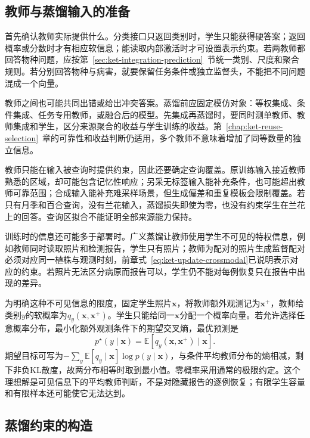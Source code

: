 \subsection{教师与蒸馏输入的准备}
\label{sec:ket-integration-teachers-inputs}

首先确认教师实际提供什么。分类接口只返回类别时，学生只能获得硬答案；返回概率或分数时才有相应软信息；能读取内部激活时才可设置表示约束。若两教师都回答物种问题，应按第~\ref{sec:ket-integration-prediction}~节统一类别、尺度和聚合规则。若分别回答物种与病害，就要保留任务条件或独立监督头，不能把不同问题混成一个向量。

教师之间也可能共同出错或给出冲突答案。蒸馏前应固定模仿对象：等权集成、条件集成、任务专用教师，或融合后的模型。先集成再蒸馏时，要同时测单教师、教师集成和学生，区分来源聚合的收益与学生训练的收益。第~\ref{chap:ket-reuse-selection}~章的可靠性和收益判断仍适用，多个教师不意味着增加了同等数量的独立信息。

教师只能在输入被查询时提供约束，因此还要确定查询覆盖。原训练输入接近教师熟悉的区域，却可能包含记忆性响应；另采无标签输入能补充条件，也可能超出教师可靠范围；合成输入能补充难采样场景，但生成偏差和重复模板会限制覆盖。若只有月季和百合查询，没有兰花输入，蒸馏损失即使为零，也没有约束学生在兰花上的回答。查询区拟合不能证明全部来源能力保持。

训练时的信息还可能多于部署时。广义蒸馏让教师使用学生不可见的特权信息，例如教师同时读取照片和检测报告，学生只有照片；教师为配对的照片生成监督配对必须对应同一植株与观测时刻，前章式~\eqref{eq:ket-update-crossmodal}已说明表示对应的约束。若照片无法区分病原而报告可以，学生仍不能对每例恢复只在报告中出现的差异。

为明确这种不可见信息的限度，固定学生照片$\bm{x}$，将教师额外观测记为$\bm{x}^{+}$，教师给类别$y$的软概率为$q_y(\bm{x},\bm{x}^{+})$。学生只能给同一$\bm{x}$分配一个概率向量。若允许选择任意概率分布，最小化额外观测条件下的期望交叉熵，最优预测是
\begin{equation}
  p^\star(y\mid\bm{x})
   =\mathbb{E}\!\left[q_y(\bm{x},\bm{x}^{+})\mid\bm{x}\right].
  \label{eq:ket-integration-privileged-limit}
\end{equation}
期望目标可写为$-\sum_y\mathbb{E}[q_y\mid\bm{x}]\log p(y\mid\bm{x})$，与条件平均教师分布的熵相减，剩下非负KL散度，故两分布相等时取到最小值。零概率采用通常的极限约定。这个理想解是可见信息下的平均教师判断，不是对隐藏报告的逐例恢复；有限学生容量和有限样本还可能使它无法达到。

\subsection{蒸馏约束的构造}
\label{sec:ket-integration-distillation-losses}

